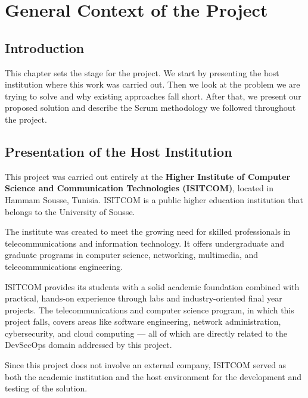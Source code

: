 
\chapter{General Context of the Project}
\label{chap:context}

\section{Introduction}

This chapter sets the stage for the project. We start by presenting the host institution where this work was carried out. Then we look at the problem we are trying to solve and why existing approaches fall short. After that, we present our proposed solution and describe the Scrum methodology we followed throughout the project.


\section{Presentation of the Host Institution}
\label{sec:isitcom}

This project was carried out entirely at the \textbf{Higher Institute of Computer Science and Communication Technologies (ISITCOM)}, located in Hammam Sousse, Tunisia. ISITCOM is a public higher education institution that belongs to the University of Sousse.

The institute was created to meet the growing need for skilled professionals in telecommunications and information technology. It offers undergraduate and graduate programs in computer science, networking, multimedia, and telecommunications engineering.

ISITCOM provides its students with a solid academic foundation combined with practical, hands-on experience through labs and industry-oriented final year projects. The telecommunications and computer science program, in which this project falls, covers areas like software engineering, network administration, cybersecurity, and cloud computing --- all of which are directly related to the DevSecOps domain addressed by this project.

Since this project does not involve an external company, ISITCOM served as both the academic institution and the host environment for the development and testing of the solution.

